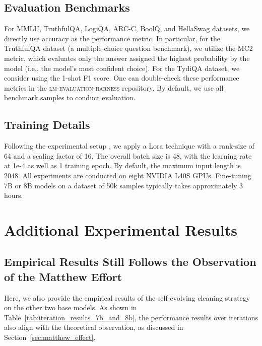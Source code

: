\subsection{Evaluation Benchmarks}\label{sec:appendix_evalution_details}

For MMLU, TruthfulQA, LogiQA, ARC-C, BoolQ, and HellaSwag datasets, we directly use accuracy as the performance metric.
In particular, for the TruthfulQA dataset (a multiple-choice question benchmark), we utilize the MC2 metric, which evaluates only the answer assigned the highest probability by the model (i.e., the model's most confident choice). 
For the TydiQA dataset, we consider using the 1-shot F1 score. One can double-check these performance metrics in the \textsc{lm-evaluation-harness} repository. By default, we use all benchmark samples to conduct evaluation.


\subsection{Training Details}
Following the experimental setup \citep{wang2023far}, we apply a Lora technique with a rank-size of 64 and a scaling factor of 16. The overall batch size is 48, with the learning rate at 1e-4 as well as 1 training epoch. By default, the maximum input length is 2048. All experiments are conducted on eight NVIDIA L40S GPUs. Fine-tuning 7B or 8B models on a dataset of 50k samples typically takes approximately 3 hours.

\section{Additional Experimental Results}\label{sec:apx_more_exp_results}




\subsection{Empirical Results Still Follows the Observation of the Matthew Effort}

Here, we also provide the empirical results of the self-evolving cleaning strategy on the other two base models. As shown in Table~\ref{tab:iteration_results_7b_and_8b}, the performance results over iterations also align with the theoretical observation, as discussed in Section~\ref{sec:matthew_effect}.


